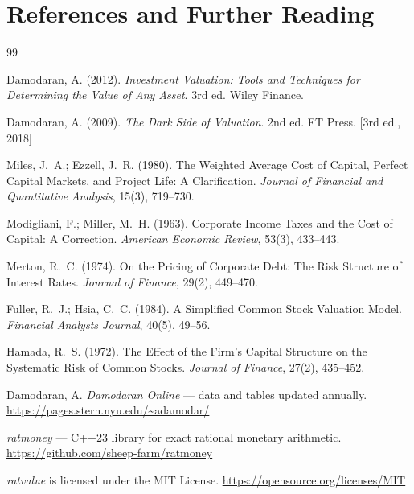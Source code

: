 \documentclass[12pt, a4paper, oneside]{book}
\begin{document}
\chapter{References and Further Reading}

\begin{thebibliography}{99}

Damodaran, A. (2012).
\textit{Investment Valuation: Tools and Techniques for Determining the Value of Any Asset}.
3rd ed. Wiley Finance.

Damodaran, A. (2009).
\textit{The Dark Side of Valuation}.
2nd ed. FT Press.
[3rd ed., 2018]

Miles, J.\ A.; Ezzell, J.\ R. (1980).
The Weighted Average Cost of Capital, Perfect Capital Markets, and Project Life:
A Clarification.
\textit{Journal of Financial and Quantitative Analysis}, 15(3), 719--730.

Modigliani, F.; Miller, M.\ H. (1963).
Corporate Income Taxes and the Cost of Capital: A Correction.
\textit{American Economic Review}, 53(3), 433--443.

Merton, R.\ C. (1974).
On the Pricing of Corporate Debt: The Risk Structure of Interest Rates.
\textit{Journal of Finance}, 29(2), 449--470.

Fuller, R.\ J.; Hsia, C.\ C. (1984).
A Simplified Common Stock Valuation Model.
\textit{Financial Analysts Journal}, 40(5), 49--56.

Hamada, R.\ S. (1972).
The Effect of the Firm's Capital Structure on the Systematic Risk of Common Stocks.
\textit{Journal of Finance}, 27(2), 435--452.

Damodaran, A.
\textit{Damodaran Online} --- data and tables updated annually.
\url{https://pages.stern.nyu.edu/~adamodar/}

\textit{ratmoney} --- C++23 library for exact rational monetary arithmetic.
\url{https://github.com/sheep-farm/ratmoney}

\textit{ratvalue} is licensed under the MIT License.
\url{https://opensource.org/licenses/MIT}

\end{thebibliography}
\end{document}
